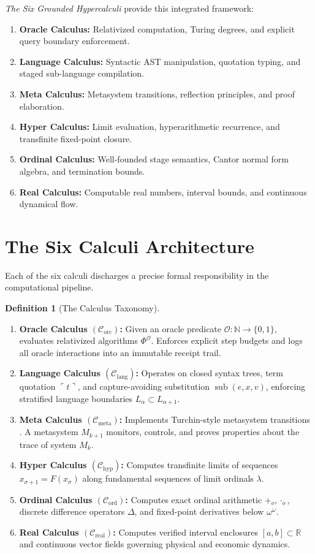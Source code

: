 \documentclass[11pt]{article}
\theoremstyle{definition}
\newtheorem{definition}[theorem]{Definition}
\newcommand{\N}{\mathbb N}
\newcommand{\R}{\mathbb R}
\newcommand{\code}[1]{\ulcorner #1\urcorner}
\begin{document}
\emph{The Six Grounded Hypercalculi} provide this integrated framework:
\begin{enumerate}
\item \textbf{Oracle Calculus:} Relativized computation, Turing degrees, and explicit query boundary enforcement.
\item \textbf{Language Calculus:} Syntactic AST manipulation, quotation typing, and staged sub-language compilation.
\item \textbf{Meta Calculus:} Metasystem transitions, reflection principles, and proof elaboration.
\item \textbf{Hyper Calculus:} Limit evaluation, hyperarithmetic recurrence, and transfinite fixed-point closure.
\item \textbf{Ordinal Calculus:} Well-founded stage semantics, Cantor normal form algebra, and termination bounds.
\item \textbf{Real Calculus:} Computable real numbers, interval bounds, and continuous dynamical flow.
\end{enumerate}

\section{The Six Calculi Architecture}
Each of the six calculi discharges a precise formal responsibility in the computational pipeline.

\begin{definition}[The Calculus Taxonomy]
\hfill
\begin{enumerate}
\item \textbf{Oracle Calculus $(\mathcal{C}_{\mathrm{orc}})$:} Given an oracle predicate $\mathcal{O}\colon \N \to \{0, 1\}$, evaluates relativized algorithms $\Phi^\mathcal{O}$. Enforces explicit step budgets and logs all oracle interactions into an immutable receipt trail.
\item \textbf{Language Calculus $(\mathcal{C}_{\mathrm{lang}})$:} Operates on closed syntax trees, term quotation $\code{t}$, and capture-avoiding substitution $\operatorname{sub}(e, x, v)$, enforcing stratified language boundaries $L_\alpha \subset L_{\alpha+1}$.
\item \textbf{Meta Calculus $(\mathcal{C}_{\mathrm{meta}})$:} Implements Turchin-style metasystem transitions \cite{turchin}. A metasystem $M_{k+1}$ monitors, controls, and proves properties about the trace of system $M_k$.
\item \textbf{Hyper Calculus $(\mathcal{C}_{\mathrm{hyp}})$:} Computes transfinite limits of sequences $x_{\sigma+1} = F(x_\sigma)$ along fundamental sequences of limit ordinals $\lambda$.
\item \textbf{Ordinal Calculus $(\mathcal{C}_{\mathrm{ord}})$:} Computes exact ordinal arithmetic $+_o, \cdot_o$, discrete difference operators $\Delta$, and fixed-point derivatives below $\omega^\omega$.
\item \textbf{Real Calculus $(\mathcal{C}_{\mathrm{real}})$:} Computes verified interval enclosures $[a, b] \subset \R$ and continuous vector fields governing physical and economic dynamics.
\end{enumerate}
\end{definition}
\end{document}
